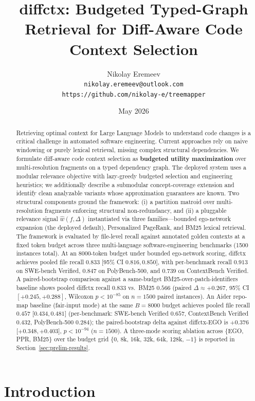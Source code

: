 \documentclass[11pt, a4paper]{article}
\title{diffctx: Budgeted Typed-Graph Retrieval for Diff-Aware Code Context Selection}
\author{
  Nikolay Eremeev \\
  \texttt{nikolay.eremeev@outlook.com} \\
  \texttt{https://github.com/nikolay-e/treemapper}
}
\date{May 2026}
\begin{document}
\maketitle

\begin{abstract}
Retrieving optimal context for Large Language Models to understand code changes is a critical challenge in automated software engineering. Current approaches rely on naive windowing or purely lexical retrieval, missing complex structural dependencies. We formulate diff-aware code context selection as \textbf{budgeted utility maximization} over multi-resolution fragments on a typed dependency graph. The deployed system uses a modular relevance objective with lazy-greedy budgeted selection and engineering heuristics; we additionally describe a submodular concept-coverage extension and identify clean analyzable variants whose approximation guarantees are known. Two structural components ground the framework: (i) a partition matroid over multi-resolution fragments enforcing structural non-redundancy, and (ii) a pluggable relevance signal $\hat{w}(f, \Delta)$ instantiated via three families---bounded ego-network expansion (the deployed default), Personalized PageRank, and BM25 lexical retrieval. The framework is evaluated by file-level recall against annotated golden contexts at a fixed token budget across three multi-language software-engineering benchmarks (1500 instances total). At an $8000$-token budget under bounded ego-network scoring, diffctx achieves pooled file recall $0.833$ [95\% CI $0.816, 0.850$], with per-benchmark recall $0.913$ on SWE-bench Verified, $0.847$ on PolyBench-500, and $0.739$ on ContextBench Verified. A paired-bootstrap comparison against a same-budget BM25-over-patch-identifiers baseline shows pooled diffctx recall $0.833$ vs.\ BM25 $0.566$ (paired $\Delta \approx +0.267$, 95\% CI $[+0.245, +0.288]$, Wilcoxon $p < 10^{-85}$ on $n=1500$ paired instances). An Aider repo-map baseline (fair-input mode) at the same $B{=}8000$ budget achieves pooled file recall $0.457$ [$0.434, 0.481$] (per-benchmark: SWE-bench Verified $0.657$, ContextBench Verified $0.432$, PolyBench-500 $0.284$); the paired-bootstrap delta against diffctx-EGO is $+0.376$ [$+0.348, +0.403$], $p < 10^{-94}$ ($n{=}1500$). A three-mode scoring ablation across $\{$EGO, PPR, BM25$\}$ over the budget grid $\{$0, 8k, 16k, 32k, 64k, 128k, $-1\}$ is reported in Section~\ref{sec:prelim-results}.
\end{abstract}

\newpage
\section{Introduction}
\end{document}
